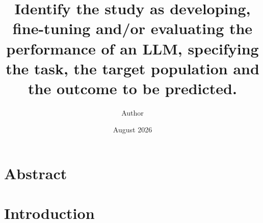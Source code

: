 \documentclass{article}
\title{Identify the study as developing, fine-tuning and/or evaluating the performance of an LLM,
specifying the task, the target population and the outcome to be predicted.}%
\author{Author }
\date{August 2026}
\begin{document}
\maketitle


\section{Abstract}
\label{sec:abstract}









\section{Introduction}\label{sec:introduction}
\end{document}
